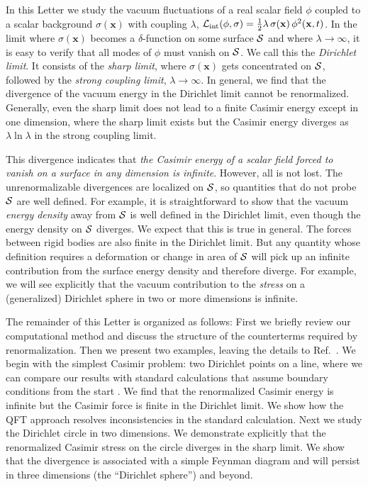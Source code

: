 \documentclass[a4paper,aps,amsfonts,prl,showpacs,nobibnotes,nofootinbib,%
tightenlines,twocolumn]{revtex4}
\newcommand{\vek}[1]{\mathbf{#1}}
\begin{document}
In this Letter we study the vacuum fluctuations of a real scalar field
$\phi$ coupled to a scalar background $\sigma(\vek x)$ with coupling
$\lambda$, $\mathcal{L}_{\rm int}(\phi,\sigma)=\frac{1}{2}\lambda\,
\sigma(\vek{x})\,\phi^{2}(\vek{x},t)$.  In the limit where
$\sigma(\vek x)$ becomes a $\delta$-function on some surface ${\cal
S}$ and where $\lambda\to\infty$, it is easy to verify that all modes
of $\phi$ must vanish on ${\cal S}$.  We call this the \emph{Dirichlet
limit}.  It consists of the \emph{sharp limit}, where
$\sigma(\vek{x})$ gets concentrated on ${\cal S}$, followed by the
\emph{strong coupling limit}, $\lambda\to \infty$.  In general, we
find that the divergence of the vacuum energy in the Dirichlet limit
cannot be renormalized.  Generally, even the sharp limit does
not lead to a finite Casimir energy except in one dimension, where the
sharp limit exists but the Casimir energy diverges as
$\lambda\ln \lambda$ in the strong coupling limit.

This divergence indicates that \emph{the Casimir energy of a
scalar field forced to vanish on a surface in any dimension is
infinite}.  However, all is not lost.  The unrenormalizable
divergences are localized on ${\cal S}$, so quantities that do not
probe ${\cal S}$ are well defined.  For example, it is straightforward
to show that the vacuum \emph{energy density} away from ${\cal S}$ is
well defined in the Dirichlet limit, even though the energy
density on ${\cal S}$ diverges\cite{GR}.  We expect that this is true
in general.  The forces between rigid bodies are also finite in the
Dirichlet limit.  But any quantity whose definition requires a
deformation or change in area of ${\cal S}$ will pick up an infinite
contribution from the surface energy density and therefore diverge. 
For example, we will see explicitly that the vacuum contribution to
the \emph{stress} on a (generalized) Dirichlet sphere in two or
more dimensions is infinite.


The remainder of this Letter is organized as follows: First we briefly
review our computational method and discuss the structure of the
counterterms required by renormalization.  Then we present two
examples, leaving the details to Ref.~\cite{dens}.  We begin with the
simplest Casimir problem: two Dirichlet points on a line, where we can
compare our results with standard calculations that assume
boundary conditions from the start \cite{MT}.   We find that the
renormalized Casimir energy is infinite but the Casimir force is
finite in the Dirichlet limit.  We show how the QFT approach resolves
inconsistencies in the standard calculation.  Next we study the
Dirichlet circle in two dimensions.  We demonstrate explicitly that
the renormalized Casimir stress on the circle diverges in the
sharp limit. We show that the
divergence is associated with a simple Feynman diagram and will
persist in three dimensions (the ``Dirichlet sphere'') and beyond.
\end{document}
